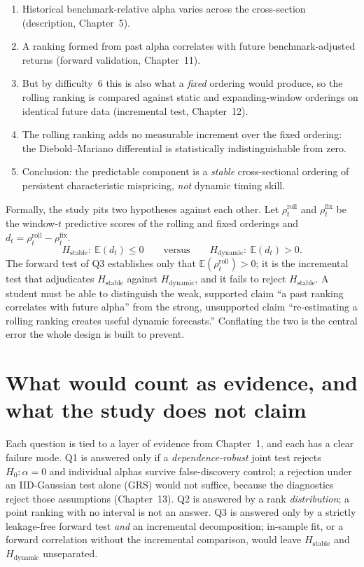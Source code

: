 \begin{enumerate}
\tightlist
\item
  Historical benchmark-relative alpha varies across the cross-section
  (description, Chapter~5).
\item
  A ranking formed from past alpha correlates with future
  benchmark-adjusted returns (forward validation, Chapter~11).
\item
  But by difficulty~6 this is also what a \emph{fixed} ordering would
  produce, so the rolling ranking is compared against static and
  expanding-window orderings on identical future data (incremental test,
  Chapter~12).
\item
  The rolling ranking adds no measurable increment over the fixed
  ordering: the Diebold--Mariano differential is statistically
  indistinguishable from zero.
\item
  Conclusion: the predictable component is a \emph{stable} cross-sectional
  ordering of persistent characteristic mispricing, \emph{not} dynamic
  timing skill.
\end{enumerate}

Formally, the study pits two hypotheses against each other. Let $\rho^{\mathrm{roll}}_t$
and $\rho^{\mathrm{fix}}_t$ be the window-$t$ predictive scores of the
rolling and fixed orderings and $d_t=\rho^{\mathrm{roll}}_t-\rho^{\mathrm{fix}}_t$.
\begin{equation}
H_{\text{stable}}:\ \mathbb{E}(d_t)\le 0
\qquad\text{versus}\qquad
H_{\text{dynamic}}:\ \mathbb{E}(d_t)>0 .
\end{equation}
The forward test of Q3 establishes only that
$\mathbb{E}(\rho^{\mathrm{roll}}_t)>0$; it is the incremental test that
adjudicates $H_{\text{stable}}$ against $H_{\text{dynamic}}$, and it fails
to reject $H_{\text{stable}}$. A student must be able to distinguish the
weak, supported claim ``a past ranking correlates with future alpha'' from
the strong, unsupported claim ``re-estimating a rolling ranking creates
useful dynamic forecasts.'' Conflating the two is the central error the
whole design is built to prevent.

\section{What would count as evidence, and what the study does not claim}\label{rq-evidence}

Each question is tied to a layer of evidence from Chapter~1, and each has a
clear failure mode. Q1 is answered only if a \emph{dependence-robust}
joint test rejects $H_0:\alpha=0$ and individual alphas survive
false-discovery control; a rejection under an IID-Gaussian test alone
(GRS) would not suffice, because the diagnostics reject those assumptions
(Chapter~13). Q2 is answered by a rank \emph{distribution}; a point ranking
with no interval is not an answer. Q3 is answered only by a strictly
leakage-free forward test \emph{and} an incremental decomposition;
in-sample fit, or a forward correlation without the incremental
comparison, would leave $H_{\text{stable}}$ and $H_{\text{dynamic}}$
unseparated.

